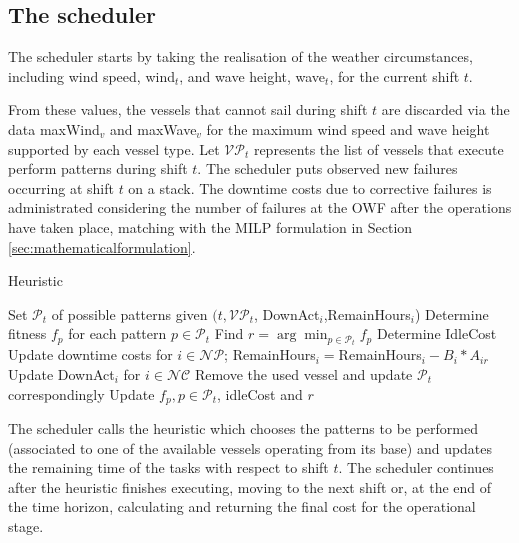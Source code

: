 \subsection{The scheduler}
The scheduler starts by taking the realisation of the weather circumstances, including wind speed, wind$_t$, and wave height, wave$_t$, for the current shift $t$.


From these values, the vessels that cannot sail during shift $t$ are discarded via the data maxWind$_v$ and maxWave$_v$ for the maximum wind speed and wave height supported by each vessel type. Let $\mathcal{VP}_t$ represents the list of vessels that execute perform patterns during shift $t$. The scheduler puts observed new failures occurring at shift $t$ on a stack. The downtime costs due to corrective failures is administrated considering the number of failures at the OWF after the operations have taken place, matching with the MILP formulation in Section \ref{sec:mathematicalformulation}.

\begin{algorithm}[h]
	\caption{Heuristic}
	\label{alg:heuristic}
	\begin{algorithmic}
		\medskip

			\STATE Set $\mathcal{P}_t$ of possible patterns
			given $(t,\mathcal{VP}_t$,  DownAct$_i$,RemainHours$_i$)\label{alg:line:allpatcosts}
			\STATE Determine fitness $f_p$ for each pattern $p \in\mathcal{P}_t$
			\STATE Find $r=\arg\min_{p\in \mathcal{P}_t} f_p$
			\STATE Determine IdleCost
				\STATE Update downtime costs for $i \in \mathcal{NP}$;
				\STATE RemainHours$_i = $RemainHours$_i -B_i*A_{ir}$
				\STATE Update DownAct$_i$ for $i\in \mathcal{NC}$
				\STATE Remove the used vessel and update $\mathcal{P}_t$ correspondingly
				\STATE Update $f_p, p\in \mathcal{P}_t$, idleCost and $r$
				\ENDFOR
			\ENDWHILE

		\vskip 5pt
	\end{algorithmic}
\end{algorithm}
The scheduler calls the heuristic which chooses the patterns to be performed (associated to one of the available vessels operating from its base) and updates the remaining time of the tasks with respect to shift $t$. The scheduler continues after the heuristic finishes executing, moving to the next shift or, at the end of the time horizon, calculating and returning the final cost for the operational stage.



